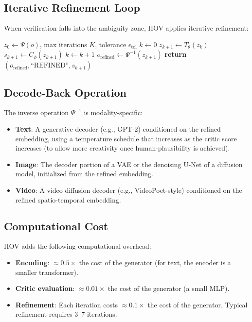 \documentclass[12pt,oneside]{article}
\begin{document}
\subsection{Iterative Refinement Loop}

When verification falls into the ambiguity zone, HOV applies iterative refinement:

\begin{algorithm}[H]
\caption{HOV Refinement Loop}
\begin{algorithmic}[1]
\Require $z_0 \leftarrow \Psi(o)$, max iterations $K$, tolerance $\epsilon_\text{tol}$
\State $k \leftarrow 0$
\Repeat
    \State $z_{k+1} \leftarrow T_\theta(z_k)$
    \State $s_{k+1} \leftarrow C_\phi(z_{k+1})$
    \State $k \leftarrow k + 1$
\State $o_\text{refined} \leftarrow \Psi^{-1}(z_{k+1})$ 
\State \textbf{return} $(o_\text{refined}, \text{``REFINED''}, s_{k+1})$
\end{algorithmic}
\end{algorithm}

\subsection{Decode-Back Operation}

The inverse operation $\Psi^{-1}$ is modality-specific:
\begin{itemize}[noitemsep]
    \item \textbf{Text}: A generative decoder (e.g., GPT-2) conditioned on the refined embedding, using a temperature schedule that increases as the critic score increases (to allow more creativity once human-plausibility is achieved).
    \item \textbf{Image}: The decoder portion of a VAE or the denoising U-Net of a diffusion model, initialized from the refined embedding.
    \item \textbf{Video}: A video diffusion decoder (e.g., VideoPoet-style) conditioned on the refined spatio-temporal embedding.
\end{itemize}

\subsection{Computational Cost}

HOV adds the following computational overhead:
\begin{itemize}[noitemsep]
    \item \textbf{Encoding}: $\approx 0.5 \times$ the cost of the generator (for text, the encoder is a smaller transformer).
    \item \textbf{Critic evaluation}: $\approx 0.01 \times$ the cost of the generator (a small MLP).
    \item \textbf{Refinement}: Each iteration costs $\approx 0.1 \times$ the cost of the generator. Typical refinement requires 3--7 iterations.
\end{itemize}
\end{document}
